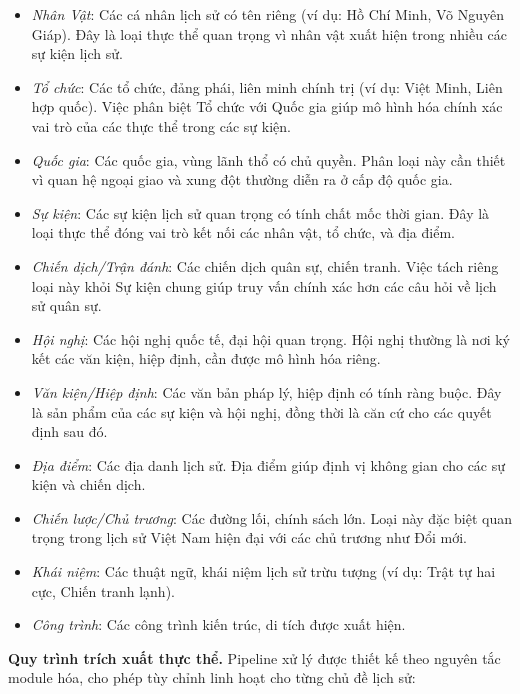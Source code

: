 \begin{itemize}
    \item \textit{Nhân Vật}: Các cá nhân lịch sử có tên riêng (ví dụ: Hồ Chí Minh, Võ Nguyên Giáp). Đây là loại thực thể quan trọng vì nhân vật xuất hiện trong nhiều các sự kiện lịch sử.
    \item \textit{Tổ chức}: Các tổ chức, đảng phái, liên minh chính trị (ví dụ: Việt Minh, Liên hợp quốc). Việc phân biệt Tổ chức với Quốc gia giúp mô hình hóa chính xác vai trò của các thực thể trong các sự kiện.
    \item \textit{Quốc gia}: Các quốc gia, vùng lãnh thổ có chủ quyền. Phân loại này cần thiết vì quan hệ ngoại giao và xung đột thường diễn ra ở cấp độ quốc gia.
    \item \textit{Sự kiện}: Các sự kiện lịch sử quan trọng có tính chất mốc thời gian. Đây là loại thực thể đóng vai trò kết nối các nhân vật, tổ chức, và địa điểm.
    \item \textit{Chiến dịch/Trận đánh}: Các chiến dịch quân sự, chiến tranh. Việc tách riêng loại này khỏi Sự kiện chung giúp truy vấn chính xác hơn các câu hỏi về lịch sử quân sự.
    \item \textit{Hội nghị}: Các hội nghị quốc tế, đại hội quan trọng. Hội nghị thường là nơi ký kết các văn kiện, hiệp định, cần được mô hình hóa riêng.
    \item \textit{Văn kiện/Hiệp định}: Các văn bản pháp lý, hiệp định có tính ràng buộc. Đây là sản phẩm của các sự kiện và hội nghị, đồng thời là căn cứ cho các quyết định sau đó.
    \item \textit{Địa điểm}: Các địa danh lịch sử. Địa điểm giúp định vị không gian cho các sự kiện và chiến dịch.
    \item \textit{Chiến lược/Chủ trương}: Các đường lối, chính sách lớn. Loại này đặc biệt quan trọng trong lịch sử Việt Nam hiện đại với các chủ trương như Đổi mới.
    \item \textit{Khái niệm}: Các thuật ngữ, khái niệm lịch sử trừu tượng (ví dụ: Trật tự hai cực, Chiến tranh lạnh).
    \item \textit{Công trình}: Các công trình kiến trúc, di tích được xuất hiện.
\end{itemize}

\vspace{0.5em}
\noindent\textbf{Quy trình trích xuất thực thể.}
Pipeline xử lý được thiết kế theo nguyên tắc module hóa, cho phép tùy chỉnh linh hoạt cho từng chủ đề lịch sử:

